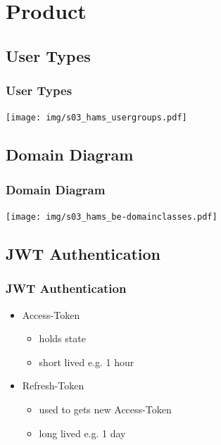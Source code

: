 \documentclass[aspectratio=1610,20pt,utf8]{beamer}
\begin{document}
\section{Product}
\subsection{User Types}
\begin{frame}
	\frametitle{User Types}
	\begin{minipage}{15cm}
		\texttt{[image: img/s03\_hams\_usergroups.pdf]}
		\centering
	\end{minipage}%
\end{frame}


\subsection{Domain Diagram}
\begin{frame}
	\frametitle{Domain Diagram}
	\texttt{[image: img/s03\_hams\_be-domainclasses.pdf]}
	\centering
\end{frame}


\subsection{JWT Authentication}
\begin{frame}
	\frametitle{JWT Authentication}
	\begin{itemize}
		\item Access-Token
		\begin{itemize}
			\item holds state
			\item short lived e.g. 1 hour
		\end{itemize}
		\item Refresh-Token
		\begin{itemize}
			\item used to gets new Access-Token
			\item long lived e.g. 1 day
		\end{itemize}
	\end{itemize}
\end{frame}

\end{document}
